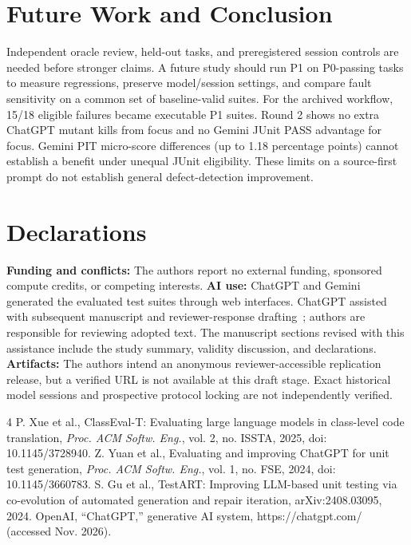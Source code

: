 \documentclass[conference]{IEEEtran}
\begin{document}
\section{Future Work and Conclusion}
Independent oracle review, held-out tasks, and preregistered session controls are needed before stronger claims. A future study should run P1 on P0-passing tasks to measure regressions, preserve model/session settings, and compare fault sensitivity on a common set of baseline-valid suites. For the archived workflow, 15/18 eligible failures became executable P1 suites. Round 2 shows no extra ChatGPT mutant kills from focus and no Gemini JUnit PASS advantage for focus. Gemini PIT micro-score differences (up to 1.18 percentage points) cannot establish a benefit under unequal JUnit eligibility. These limits on a source-first prompt do not establish general defect-detection improvement.


\section*{Declarations}
\textbf{Funding and conflicts:} The authors report no external funding, sponsored compute credits, or competing interests. \textbf{AI use:} ChatGPT and Gemini generated the evaluated test suites through web interfaces. ChatGPT assisted with subsequent manuscript and reviewer-response drafting~\cite{chatgpttool}; authors are responsible for reviewing adopted text. The manuscript sections revised with this assistance include the study summary, validity discussion, and declarations. \textbf{Artifacts:} The authors intend an anonymous reviewer-accessible replication release, but a verified URL is not available at this draft stage. Exact historical model sessions and prospective protocol locking are not independently verified.

\begin{thebibliography}{4}
 P. Xue et al., ClassEval-T: Evaluating large language models in class-level code translation, \emph{Proc. ACM Softw. Eng.}, vol. 2, no. ISSTA, 2025, doi: 10.1145/3728940.
 Z. Yuan et al., Evaluating and improving ChatGPT for unit test generation, \emph{Proc. ACM Softw. Eng.}, vol. 1, no. FSE, 2024, doi: 10.1145/3660783.
 S. Gu et al., TestART: Improving LLM-based unit testing via co-evolution of automated generation and repair iteration, arXiv:2408.03095, 2024.
 OpenAI, ``ChatGPT,'' generative AI system, https://chatgpt.com/ (accessed Nov. 2026).
\end{thebibliography}
\end{document}
